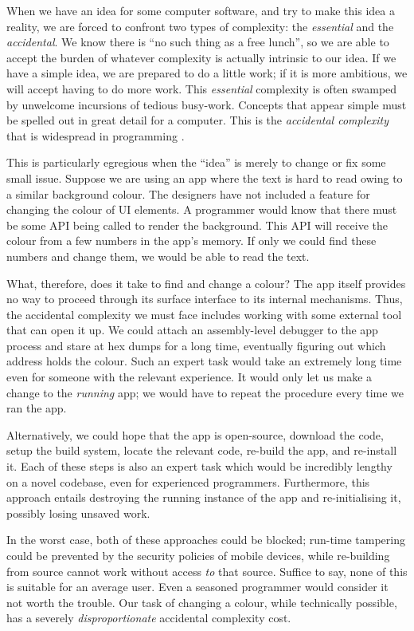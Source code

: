 \documentclass[ twoside,openright,titlepage,numbers=noenddot,headinclude,footinclude,cleardoublepage=empty,abstract=on,
                BCOR=5mm,paper=a4,fontsize=11pt
                ]{scrreprt}
\theoremstyle{definition}
\begin{document}
When we have an idea for some computer software, and try to make this
idea a reality, we are forced to confront two types of complexity: the
\emph{essential} and the \emph{accidental}. We know there is ``no such
thing as a free lunch'', so we are able to accept the burden of whatever
complexity is actually intrinsic to our idea. If we have a simple idea,
we are prepared to do a little work; if it is more ambitious, we will
accept having to do more work. This \emph{essential} complexity is often
swamped by unwelcome incursions of tedious busy-work. Concepts that
appear simple must be spelled out in great detail for a computer. This
is the \emph{accidental complexity} that is widespread in programming
\parencite{MMM}.

This is particularly egregious when the ``idea'' is merely to change or
fix some small issue. Suppose we are using an app where the text is hard
to read owing to a similar background colour. The designers have not
included a feature for changing the colour of UI elements. A programmer
would know that there must be some API being called to render the
background. This API will receive the colour from a few numbers in the
app's memory. If only we could find these numbers and change them, we
would be able to read the text.

What, therefore, does it take to find and change a colour? The app
itself provides no way to proceed through its surface interface to its
internal mechanisms. Thus, the accidental complexity we must face
includes working with some external tool that can open it up. We could
attach an assembly-level debugger to the app process and stare at hex
dumps for a long time, eventually figuring out which address holds the
colour. Such an expert task would take an extremely long time even for
someone with the relevant experience. It would only let us make a change
to the \emph{running} app; we would have to repeat the procedure every
time we ran the app.

Alternatively, we could hope that the app is open-source, download the
code, setup the build system, locate the relevant code, re-build the
app, and re-install it. Each of these steps is also an expert task which
would be incredibly lengthy on a novel codebase, even for experienced
programmers. Furthermore, this approach entails destroying the running
instance of the app and re-initialising it, possibly losing unsaved
work.

In the worst case, both of these approaches could be blocked; run-time
tampering could be prevented by the security policies of mobile devices,
while re-building from source cannot work without access \emph{to} that
source. Suffice to say, none of this is suitable for an average user.
Even a seasoned programmer would consider it not worth the trouble. Our
task of changing a colour, while technically possible, has a severely
\emph{disproportionate} accidental complexity cost.
\end{document}
